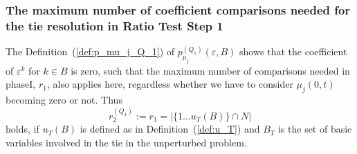 \documentclass[a4paper]{article}
\newcommand{\pmu}[2]{\ensuremath{p_{\mu_{j}}^{(#1)}(\varepsilon, #2)}}
\begin{document}
\subsubsection{The maximum number of coefficient comparisons needed for the tie
resolution in Ratio Test Step 1}
The Definition~(\ref{def:p_mu_j_Q_1}) of
\pmu{Q_{1}}{B} shows that the coefficient of
$\varepsilon^{k}$ for $k \in B$ is zero, such that the maximum number of
comparisons needed in phaseI, $r_{1}$, also applies here, regardless whether we
have to consider $\mu_{j}(0, t)$ becoming zero or not. Thus
\begin{equation}
r_{2}^{(Q_{1})}:= r_{1} = \left|\{1 \ldots u_{T}(B)\} \cap N \right|
\end{equation}
holds, if $u_{T}(B)$ is defined as in Definition~(\ref{def:u_T}) and $B_{T}$ is the
set of basic variables involved in the tie in the unperturbed problem.
\end{document}
